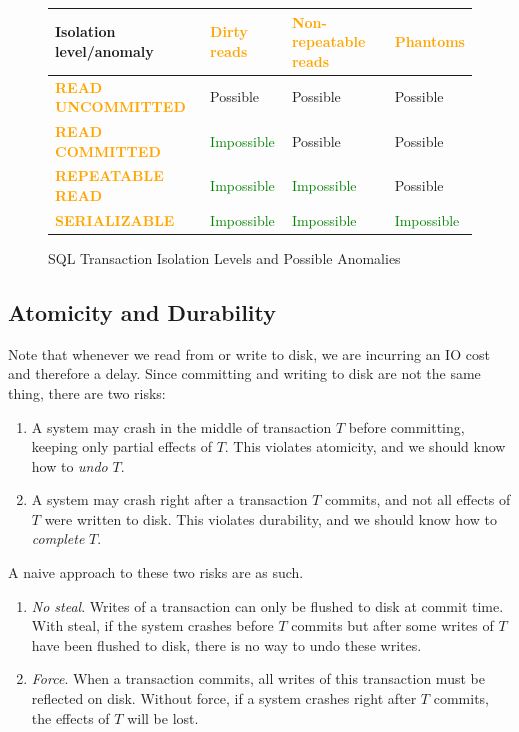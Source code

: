     \begin{figure}[H]
      \centering
      \begin{tabular}{|p{5cm}|p{2cm}|p{4cm}|p{2cm}|}
        \hline
        \textbf{Isolation level/anomaly} & \textcolor{orange}{\textbf{Dirty reads}} & \textcolor{orange}{\textbf{Non-repeatable reads}} & \textcolor{orange}{\textbf{Phantoms}} \\
        \hline
        \textcolor{orange}{\textbf{READ UNCOMMITTED}} & Possible & Possible & Possible \\
        \hline
        \textcolor{orange}{\textbf{READ COMMITTED}} & \textcolor{green}{Impossible} & Possible & Possible \\
        \hline
        \textcolor{orange}{\textbf{REPEATABLE READ}} & \textcolor{green}{Impossible} & \textcolor{green}{Impossible} & Possible \\
        \hline
        \textcolor{orange}{\textbf{SERIALIZABLE}} & \textcolor{green}{Impossible} & \textcolor{green}{Impossible} & \textcolor{green}{Impossible} \\
        \hline
      \end{tabular}
      \caption{SQL Transaction Isolation Levels and Possible Anomalies}
      \label{fig:isolation-levels}
    \end{figure}


\subsection{Atomicity and Durability} 

    Note that whenever we read from or write to disk, we are incurring an IO cost and therefore a delay. Since committing and writing to disk are not the same thing, there are two risks: 
    \begin{enumerate}
      \item A system may crash in the middle of transaction $T$ before committing, keeping only partial effects of $T$. This violates atomicity, and we should know how to \textit{undo} $T$. 
      \item A system may crash right after a transaction $T$ commits, and not all effects of $T$ were written to disk. This violates durability, and we should know how to \textit{complete} $T$. 
    \end{enumerate} 

    \begin{example}
      A naive approach to these two risks are as such.  
      \begin{enumerate}
        \item \textit{No steal}. Writes of a transaction can only be flushed to disk at commit time. With steal, if the system crashes before $T$ commits but after some writes of $T$ have been flushed to disk, there is no way to undo these writes. 
        \item \textit{Force}. When a transaction commits, all writes of this transaction must be reflected on disk. Without force, if a system crashes right after $T$ commits, the effects of $T$ will be lost. 
      \end{enumerate}
    \end{example}

